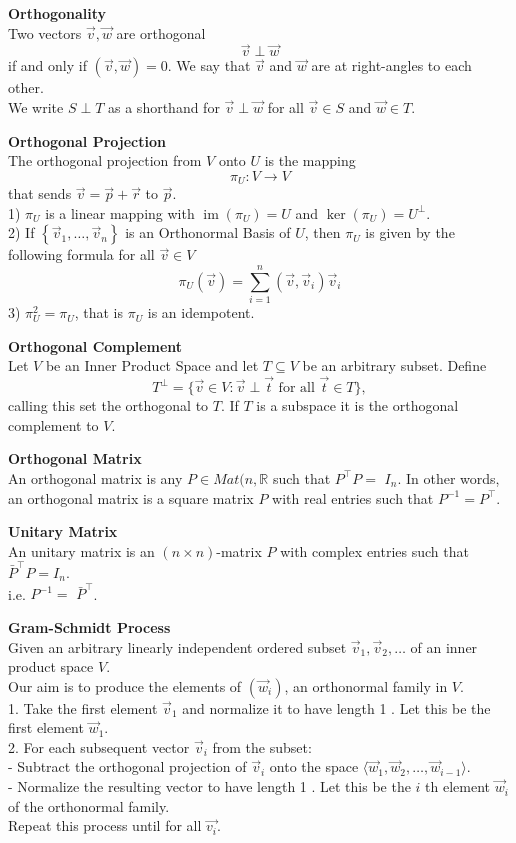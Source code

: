 \documentclass[a4paper, 10pt]{article}
\begin{document}
\begin{multicols*}{3}
\textbf{Orthogonality}\\
Two vectors $\vec{v}, \vec{w}$ are orthogonal 
$$
\vec{v} \perp \vec{w}
$$
if and only if $(\vec{v}, \vec{w})=0$. We say that $\vec{v}$ and $\vec{w}$ are at right-angles to each other. \\
We write $S \perp T$ as a shorthand for $\vec{v} \perp \vec{w}$ for all $\vec{v} \in S$ and $\vec{w} \in T$.

\textbf{Orthogonal Projection}\\
The orthogonal projection from $V$ onto $U$ is the mapping
$$
\pi_U: V \rightarrow V
$$
that sends $\vec{v}=\vec{p}+\vec{r}$ to $\vec{p}$.\\
1) $\pi_U$ is a linear mapping with $\operatorname{im}\left(\pi_U\right)=U$ and $\operatorname{ker}\left(\pi_U\right)=U^{\perp}$.\\
2) If $\left\{\vec{v}_1, \ldots, \vec{v}_n\right\}$ is an Orthonormal Basis of $U$, then $\pi_U$ is given by the following formula for all $\vec{v} \in V$
$$
\pi_U(\vec{v})=\sum_{i=1}^n\left(\vec{v}, \vec{v}_i\right) \vec{v}_i
$$
3) $\pi_U^2=\pi_U$, that is $\pi_U$ is an idempotent.

\textbf{Orthogonal Complement}\\
Let $V$ be an Inner Product Space and let $T \subseteq V$ be an arbitrary subset. Define
$$
T^{\perp}=\{\vec{v} \in V: \vec{v} \perp \vec{t} \text { for all } \vec{t} \in T\},
$$
calling this set the orthogonal to $T$.
If $T$ is a subspace it is the orthogonal complement to $V$. 

\textbf{Orthogonal Matrix}\\
An orthogonal matrix is any $P\in Mat(n, \mathbb{R}$ such that $P^{\top} P=$ $I_n$. 
In other words, an orthogonal matrix is a square matrix $P$ with real entries such that $P^{-1}=P^{\top}$.

\textbf{Unitary Matrix}\\
An unitary matrix is an $(n \times n)$-matrix $P$ with complex entries such that $\bar{P}^{\top} P=I_n$. \\
i.e. $P^{-1}=$ $\bar{P}^{\top}$.

\textbf{Gram-Schmidt Process}\\
Given an arbitrary linearly independent ordered subset $\vec{v}_1, \vec{v}_2, \ldots$ of an inner product space $V$. \\
Our aim is to produce the elements of $(\vec{w}_i)$, an orthonormal family in $V$. \\
1. Take the first element $\vec{v}_1$ and normalize it to have length 1 . Let this be the first element $\vec{w}_1$.\\
2. For each subsequent vector $\vec{v}_i$ from the subset:\\
	- Subtract the orthogonal projection of $\vec{v}_i$ onto the space $\langle \vec{w}_1, \vec{w}_2, \ldots, \vec{w}_{i-1}\rangle$.\\
	- Normalize the resulting vector to have length 1 . Let this be the $i$ th element $\vec{w}_i$ of the orthonormal family.\\
Repeat this process until for all $\vec{v_i}$.


\end{multicols*}
\end{document}
